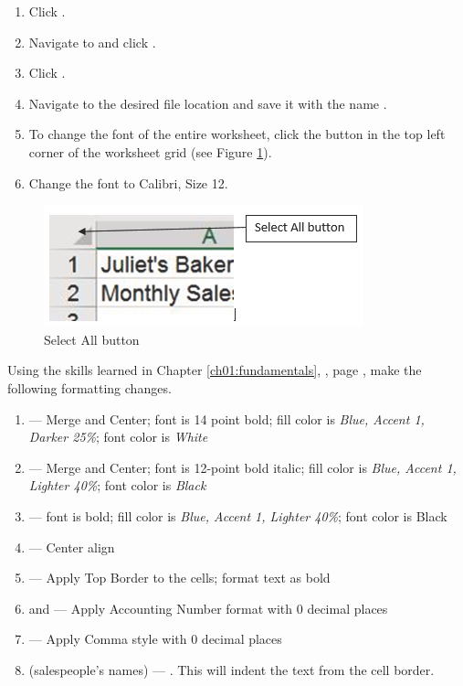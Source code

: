 \begin{enumbox}
	\begin{enumerate}
		\item Click .
		\item Navigate to  and click .
		\item Click .
		\item Navigate to the desired file location and save it with the name .
		\item To change the font of the entire worksheet, click the  button in the top left corner of the worksheet grid (see Figure \ref{02:fig41}).
		\item Change the font to Calibri, Size 12.
	\end{enumerate}
\end{enumbox}

\begin{figure}[H]
	\centering
	\includegraphics[width=\maxwidth{.95\linewidth}]{gfx/ch02_fig41}
	\caption{Select All button}
	\label{02:fig41}
\end{figure}

Using the skills learned in Chapter \ref{ch01:fundamentals}, , page \pageref{ch01:fundamentals}, make the following formatting changes.

\begin{enumbox}
	\begin{enumerate}
		\item {} --- Merge and Center; font is 14 point bold; fill color is \textit{Blue, Accent 1, Darker 25\%}; font color is \textit{White}
		\item {} --- Merge and Center; font is 12-point bold italic; fill color is \textit{Blue, Accent 1, Lighter 40\%}; font color is \textit{Black}
		\item {} --- font is bold; fill color is \textit{Blue, Accent 1, Lighter 40\%}; font color is Black
		\item {} --- Center align
		\item {} --- Apply Top Border to the cells; format text as bold
		\item {} and  --- Apply Accounting Number format with $ 0 $ decimal places
		\item {} --- Apply Comma style with $ 0 $ decimal places
		\item {} (salespeople's names) --- . This will indent the text from the cell border.
	\end{enumerate}
\end{enumbox}

